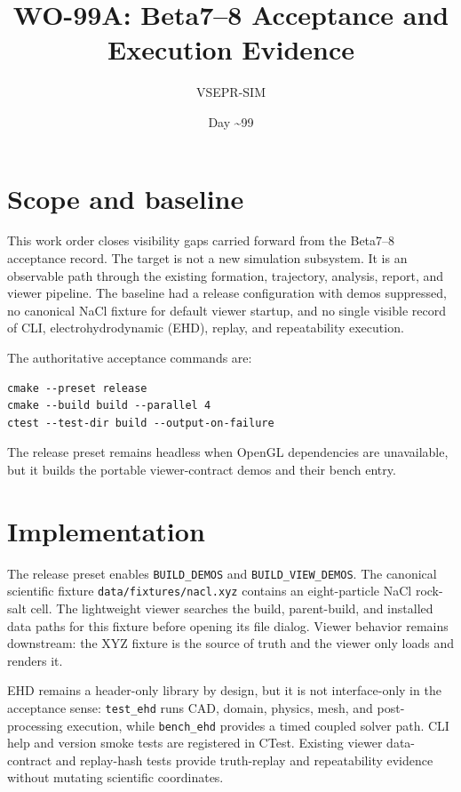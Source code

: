 \documentclass[11pt]{article}
\title{WO-99A: Beta7--8 Acceptance and Execution Evidence}
\author{VSEPR-SIM}
\date{Day \textasciitilde99}
\begin{document}
\maketitle

\section*{Scope and baseline}
This work order closes visibility gaps carried forward from the Beta7--8
acceptance record. The target is not a new simulation subsystem. It is an
observable path through the existing formation, trajectory, analysis, report,
and viewer pipeline. The baseline had a release configuration with demos
suppressed, no canonical NaCl fixture for default viewer startup, and no
single visible record of CLI, electrohydrodynamic (EHD), replay, and
repeatability execution.

The authoritative acceptance commands are:
\begin{verbatim}
cmake --preset release
cmake --build build --parallel 4
ctest --test-dir build --output-on-failure
\end{verbatim}
The release preset remains headless when OpenGL dependencies are unavailable,
but it builds the portable viewer-contract demos and their bench entry.

\section*{Implementation}
The release preset enables \texttt{BUILD\_DEMOS} and \texttt{BUILD\_VIEW\_DEMOS}.
The canonical scientific fixture \texttt{data/fixtures/nacl.xyz} contains an
eight-particle NaCl rock-salt cell. The lightweight viewer searches the build,
parent-build, and installed data paths for this fixture before opening its file
dialog. Viewer behavior remains downstream: the XYZ fixture is the source of
truth and the viewer only loads and renders it.

EHD remains a header-only library by design, but it is not interface-only in
the acceptance sense: \texttt{test\_ehd} runs CAD, domain, physics, mesh, and
post-processing execution, while \texttt{bench\_ehd} provides a timed coupled
solver path. CLI help and version smoke tests are registered in CTest. Existing
viewer data-contract and replay-hash tests provide truth-replay and
repeatability evidence without mutating scientific coordinates.

\newpage
\end{document}
